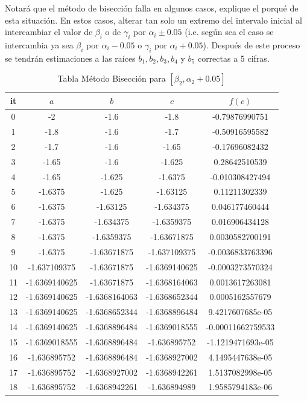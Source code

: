 \documentclass{article} %
\begin{document}
Notará que el método de bisección falla en algunos casos, explique el porqué de esta situación. En estos casos, alterar tan solo un extremo del intervalo inicial al intercambiar el valor de $\beta_i$ o de $\gamma_i$ por $\alpha_i \pm 0.05$ (i.e. según sea el caso se intercambia ya sea $\beta_i$ por $\alpha_i - 0.05$ o $\gamma_i$ por $\alpha_i + 0.05$). Después de este proceso se tendrán estimaciones a las raíces $b_1,b_2,b_3,b_4$ y $b_5$ correctas a 5 cifras.

\begin{table}[H]
\centering
\begin{tabular}{|c|c|c|c|c|}
\hline
it & $a$ & $b$ & $c$ & $f(c)$\\
\hline
0 & -2 & -1.6 & -1.8 & -0.79876990751\\
1 & -1.8 & -1.6 & -1.7 & -0.50916595582\\
2 & -1.7 & -1.6 & -1.65 & -0.17696082432\\
3 & -1.65 & -1.6 & -1.625 & 0.28642510539\\
4 & -1.65 & -1.625 & -1.6375 & -0.010308427494\\
5 & -1.6375 & -1.625 & -1.63125 & 0.11211302339\\
6 & -1.6375 & -1.63125 & -1.634375 & 0.046177460444\\
7 & -1.6375 & -1.634375 & -1.6359375 & 0.016906434128\\
8 & -1.6375 & -1.6359375 & -1.63671875 & 0.0030582700191\\
9 & -1.6375 & -1.63671875 & -1.637109375 & -0.0036833763396\\
10 & -1.637109375 & -1.63671875 & -1.6369140625 & -0.0003273570324\\
11 & -1.6369140625 & -1.63671875 & -1.6368164063 & 0.0013617263081\\
12 & -1.6369140625 & -1.6368164063 & -1.6368652344 & 0.0005162557679\\
13 & -1.6369140625 & -1.6368652344 & -1.6368896484 & 9.4217607685e-05\\
14 & -1.6369140625 & -1.6368896484 & -1.6369018555 & -0.00011662759533\\
15 & -1.6369018555 & -1.6368896484 & -1.636895752 & -1.1219471693e-05\\
16 & -1.636895752 & -1.6368896484 & -1.6368927002 & 4.1495447638e-05\\
17 & -1.636895752 & -1.6368927002 & -1.6368942261 & 1.5137082998e-05\\
18 & -1.636895752 & -1.6368942261 & -1.636894989 & 1.9585794183e-06\\
\hline
\end{tabular}
\caption{Tabla Método Bisección para $[\beta_2, \alpha_2 +0.05]$}
\end{table}
\end{document}
